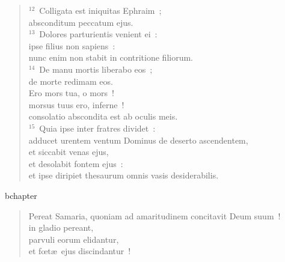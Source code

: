 \begin{verse}
${}^{12}$~Colligata est iniquitas Ephraim~;\\ absconditum peccatum ejus.\\
${}^{13}$~Dolores parturientis venient ei~:\\ ipse filius non sapiens~:\\ nunc enim non stabit in contritione filiorum.\\
${}^{14}$~De manu mortis liberabo eos~;\\ de morte redimam eos.\\ Ero mors tua, o mors~!\\ morsus tuus ero, inferne~!\\ consolatio abscondita est ab oculis meis.\\
${}^{15}$~Quia ipse inter fratres dividet~:\\ adducet urentem ventum Dominus de deserto ascendentem,\\ et siccabit venas ejus,\\ et desolabit fontem ejus~:\\ et ipse diripiet thesaurum omnis vasis desiderabilis.\end{verse}


bchapter\begin{verse}\vspace{-19pt}Pereat Samaria, quoniam ad amaritudinem concitavit Deum suum~!\\ in gladio pereant,\\ parvuli eorum elidantur,\\ et fœt\ae\ ejus discindantur~!\end{verse}


